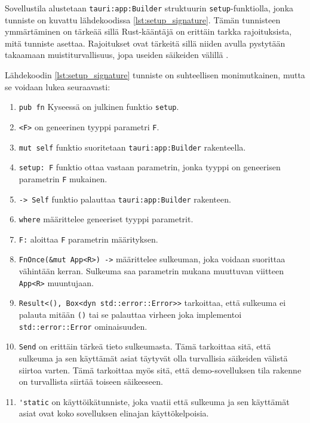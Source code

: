 \documentclass[a4paper,12pt]{article}
\begin{document}
    Sovellustila alustetaan \lstinline{tauri:app:Builder} struktuurin \lstinline{setup}-funktiolla, jonka tunniste on kuvattu lähdekoodissa \ref{lst:setup_signature}. Tämän tunnisteen ymmärtäminen on tärkeää sillä Rust-kääntäjä on erittäin tarkka rajoituksista, mitä tunniste asettaa. Rajoitukset ovat tärkeitä sillä niiden avulla pystytään takaamaan muistiturvallisuus, jopa useiden säikeiden välillä \cite[ch. 8.2]{rust-book}. \par

    Lähdekoodin \ref{lst:setup_signature} tunniste on suhteellisen monimutkainen, mutta se voidaan lukea seuraavasti:
    
    \begin{enumerate}
        \item \lstinline{pub fn} Kyseessä on julkinen funktio \lstinline{setup}.
        \item \lstinline{<F>} on geneerinen tyyppi parametri \lstinline{F}.
        \item \lstinline{mut self} funktio suoritetaan \lstinline{tauri:app:Builder} rakenteella.
        \item \lstinline{setup: F} funktio ottaa vastaan parametrin, jonka tyyppi on geneerisen parametrin \lstinline{F} mukainen.
        \item \lstinline{-> Self} funktio palauttaa \lstinline{tauri:app:Builder} rakenteen.
       \item \lstinline{where} määrittelee geneeriset tyyppi parametrit.
       \item \lstinline{F:} aloittaa \lstinline{F} parametrin määrityksen.
       \item \lstinline{FnOnce(&mut App<R>) ->} määrittelee sulkeuman, joka voidaan suorittaa vähintään kerran. Sulkeuma saa parametrin mukana muuttuvan viitteen \lstinline{App<R>} muuntujaan.
       \item \lstinline{Result<(), Box<dyn std::error::Error>>} tarkoittaa, että sulkeuma ei palauta mitään \lstinline{()} tai se palauttaa virheen joka implementoi \lstinline{std::error::Error} ominaisuuden.
       \item \lstinline{Send} on erittäin tärkeä tieto sulkeumasta. Tämä tarkoittaa sitä, että sulkeuma ja sen käyttämät asiat täytyvät olla turvallisia säikeiden välistä siirtoa varten. Tämä tarkoittaa myös sitä, että demo-sovelluksen tila rakenne on turvallista siirtää toiseen säikeeseen.
       \item \lstinline{'static} on käyttöikätunniste, joka vaatii että sulkeuma ja sen käyttämät asiat ovat koko sovelluksen elinajan käyttökelpoisia.
    \end{enumerate}
\end{document}
